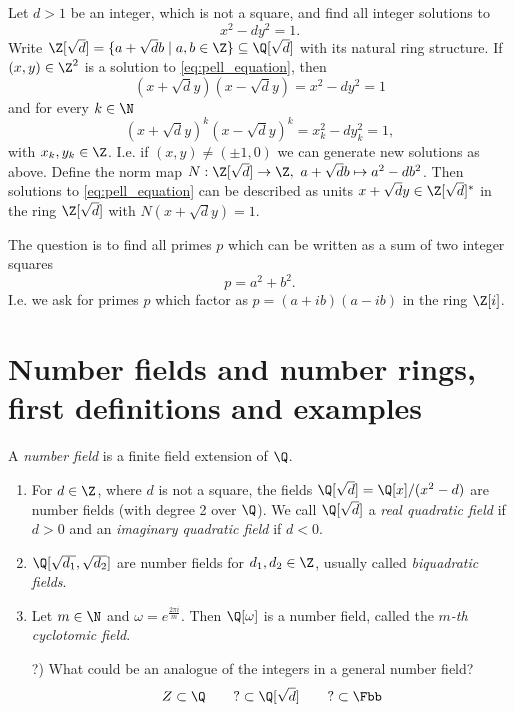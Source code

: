 
\begin{exmp}
	Let \( d > 1 \) be an integer, which is not a square, and find all integer solutions to
	\begin{equation}\label{eq:pell_equation}
		x^2 - dy^2 = 1.
	\end{equation}
	Write \( \Z[\sqrt{d}] = \{a+\sqrt{d}b \mid a,b \in \Z\} \subseteq \Q[\sqrt{d}] \) with its natural ring structure.
	If \( (x,y) \in \Z^2 \) is a solution to \eqref{eq:pell_equation}, then
	\[ (x+\sqrt{d}y)(x-\sqrt{d}y) = x^2-dy^2 = 1 \]
	and for every \( k \in \N \)
	\[ (x+\sqrt{d}y)^k(x-\sqrt{d}y)^k = x_k^2-dy_k^2 = 1, \]
	with \( x_k,y_k \in \Z \).
	I.e. if \( (x,y) \neq (\pm 1, 0) \) we can generate new solutions as above.
	Define the norm map \( N: \Z[\sqrt{d}] \to \Z,\ a+\sqrt{d}b \mapsto a^2 - db^2 \).
	Then solutions to \eqref{eq:pell_equation} can be described as units \( x+\sqrt{d}y \in \Z[\sqrt{d}]^* \) in the ring \( \Z[\sqrt{d}] \) with \( N(x+\sqrt{d}y) = 1 \).
\end{exmp}

\begin{exmp}
	The question is to find all primes \( p \) which can be written as a sum of two integer squares
	\[ p=a^2+b^2. \]
	I.e. we ask for primes \( p \) which factor as \( p = (a+ib)(a-ib) \) in the ring \( \Z[i] \).
\end{exmp}


\section[Number fields and number rings]{Number fields and number rings, first definitions and examples}

\begin{defn*}
	A \emph{number field} is a finite field extension of \( \Q \).
\end{defn*}

\begin{exmp*}
	\begin{enumerate}[label={\alph*})]
		\item For \( d \in \Z \), where \( d \) is not a square, the fields \( \Q[\sqrt{d}] = \Q[x] / (x^2-d) \) are number fields (with degree 2 over \( \Q \)).
			We call \( \Q[\sqrt{d}] \) a \emph{real quadratic field} if \( d > 0 \) and an \emph{imaginary quadratic field} if \( d < 0 \).
		\item \( \Q[\sqrt{d_1}, \sqrt{d_2}] \) are number fields for \( d_1, d_2 \in \Z \), usually called \emph{biquadratic fields}.
		\item Let \( m \in \N \) and \( \omega = e^\frac{2\pi i}{m} \).
			Then \( \Q[\omega] \) is a number field, called the \emph{\( m \)-th cyclotomic field}.
		\item[?)] What could be an analogue of the integers in a general number field?
			\[ Z \subset \Q \qquad ? \subset \Q[\sqrt{d}] \qquad ? \subset \Fbb \]
	\end{enumerate}
\end{exmp*}


